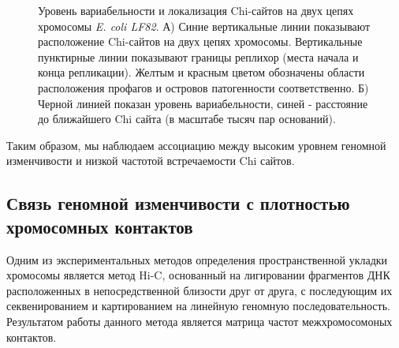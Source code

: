 \begin{figure}[!ht] 
  \center
    
    
    \caption{Уровень вариабельности и локализация Chi-сайтов на двух цепях хромосомы \textit{E. coli LF82}. А) Синие вертикальные линии показывают расположение Chi-сайтов на двух цепях хромосомы. Вертикальные пунктирные линии показывают границы реплихор (места начала и конца репликации). Желтым и красным цветом обозначены области расположения профагов и островов патогенности соответственно. Б) Черной линией показан уровень вариабельности, синей - расстояние до ближайшего Chi сайта (в масштабе тысяч пар оснований).}
    \label{img:chi_lf82}
\end{figure}

Таким образом, мы наблюдаем ассоциацию между высоким уровнем геномной изменчивости и низкой частотой встречаемости Chi сайтов. 

\subsection{Связь геномной изменчивости с плотностью хромосомных контактов}

Одним из экспериментальных методов определения пространственной укладки хромосомы является метод Hi-C, основанный на лигировании фрагментов ДНК расположенных в непосредственной близости друг от друга, с последующим их секвенированием и картированием на линейную геномную последовательность. Результатом работы данного метода является матрица частот межхромосомоных контактов.

